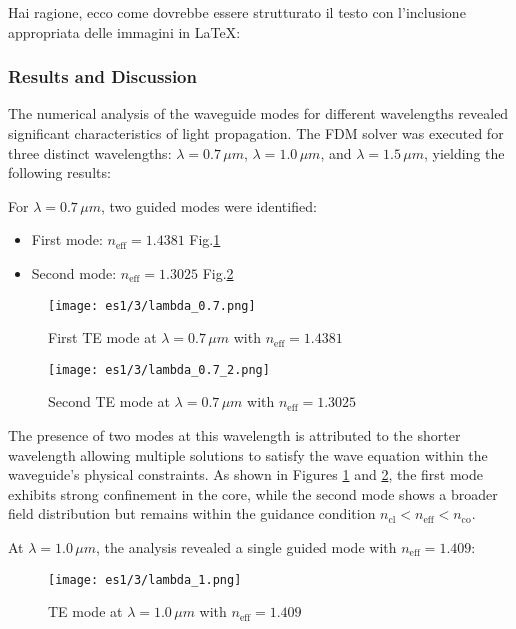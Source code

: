 \documentclass{article}
\begin{document}
Hai ragione, ecco come dovrebbe essere strutturato il testo con l'inclusione appropriata delle immagini in LaTeX:

\subsubsection{Results and Discussion}

The numerical analysis of the waveguide modes for different wavelengths revealed significant characteristics of light propagation. The FDM solver was executed for three distinct wavelengths: $\lambda = 0.7\,\mu m$, $\lambda = 1.0\,\mu m$, and $\lambda = 1.5\,\mu m$, yielding the following results:

For $\lambda = 0.7\,\mu m$, two guided modes were identified:
\begin{itemize}
\item First mode: $n_{\text{eff}} = 1.4381$ Fig.\ref{fig:TE_mode_07_1}
\item Second mode: $n_{\text{eff}} = 1.3025$ Fig.\ref{fig:TE_mode_07_2}
\end{itemize}

\begin{figure}[h]
\centering
\texttt{[image: es1/3/lambda\_0.7.png]}
\caption{First TE mode at $\lambda = 0.7\,\mu m$ with $n_{\text{eff}} = 1.4381$}
\label{fig:TE_mode_07_1}
\end{figure}

\begin{figure}[h]
\centering
\texttt{[image: es1/3/lambda\_0.7\_2.png]}
\caption{Second TE mode at $\lambda = 0.7\,\mu m$ with $n_{\text{eff}} = 1.3025$}
\label{fig:TE_mode_07_2}
\end{figure}

The presence of two modes at this wavelength is attributed to the shorter wavelength allowing multiple solutions to satisfy the wave equation within the waveguide's physical constraints. As shown in Figures \ref{fig:TE_mode_07_1} and \ref{fig:TE_mode_07_2}, the first mode exhibits strong confinement in the core, while the second mode shows a broader field distribution but remains within the guidance condition $n_{\text{cl}} < n_{\text{eff}} < n_{\text{co}}$.

At $\lambda = 1.0\,\mu m$, the analysis revealed a single guided mode with $n_{\text{eff}} = 1.409$:

\begin{figure}[h]
\centering
\texttt{[image: es1/3/lambda\_1.png]}
\caption{TE mode at $\lambda = 1.0\,\mu m$ with $n_{\text{eff}} = 1.409$}
\label{fig:TE_mode_10}
\end{figure}
\end{document}
